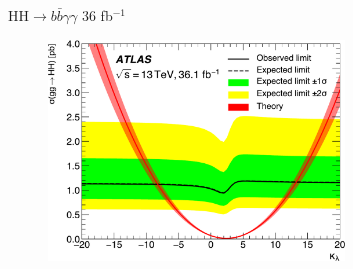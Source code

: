 \begin{frame}{HH$\to b\bar{b}\gamma\gamma$ 36 fb$^{-1}$}

\begin{figure}
    \centering
    \includegraphics[width=0.7\textwidth]{Part2/Img/36ifb_limit.pdf}
\end{figure}
    
\end{frame}